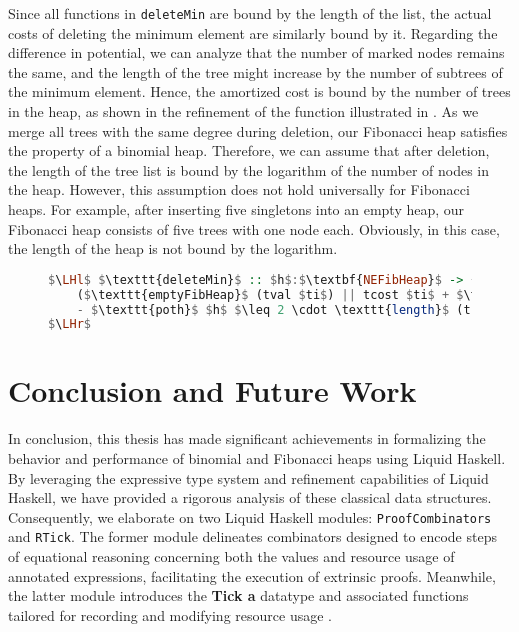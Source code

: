 \documentclass{clmthesis}
\begin{document}
Since all functions in \texttt{deleteMin} are bound by the length of the list, the actual costs of deleting the minimum element are similarly bound by it. Regarding the difference in potential, we can analyze that the number of marked nodes remains the same, and the length of the tree might increase by the number of subtrees of the minimum element. Hence, the amortized cost is bound by the number of trees in the heap, as shown in the refinement of the function illustrated in . As we merge all trees with the same degree during deletion, our Fibonacci heap satisfies the property of a binomial heap. Therefore, we can assume that after deletion, the length of the tree list is bound by the logarithm of the number of nodes in the heap. However, this assumption does not hold universally for Fibonacci heaps. For example, after inserting five singletons into an empty heap, our Fibonacci heap consists of five trees with one node each. Obviously, in this case, the length of the heap is not bound by the logarithm.
\begin{figure}[h]
\begin{lstlisting}[mathescape=true, language=haskell, caption={Amortized cost analysis of \texttt{deleteMin}.},captionpos=b, label=fig:FdeletePot]
$\LHl$ $\texttt{deleteMin}$ :: $h$:$\textbf{NEFibHeap}$ -> {$ti$:$\textbf{Tick (FibHeap a)}$ | 
	($\texttt{emptyFibHeap}$ (tval $ti$) || tcost $ti$ + $\texttt{poth}$ (tval $ti$) 
	- $\texttt{poth}$ $h$ $\leq 2 \cdot \texttt{length}$ (trees (tval $ti$)) + 1)}
$\LHr$
\end{lstlisting}
\end{figure}

\chapter{Conclusion and Future Work}\label{sec:conclusion}
In conclusion, this thesis has made significant achievements in formalizing the behavior and performance of binomial and Fibonacci heaps using Liquid Haskell. By leveraging the expressive type system and refinement capabilities of Liquid Haskell, we have provided a rigorous analysis of these classical data structures. Consequently, we elaborate on two Liquid Haskell modules: \texttt{ProofCombinators} and \texttt{RTick}. The former module delineates combinators designed to encode steps of equational reasoning concerning both the values and resource usage of annotated expressions, facilitating the execution of extrinsic proofs. Meanwhile, the latter module introduces the \textbf{Tick a} datatype and associated functions tailored for recording and modifying resource usage \cite{handley2019liquidate}.
\end{document}
